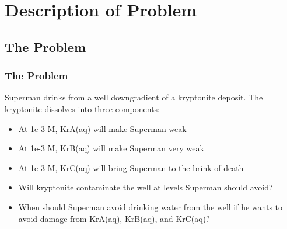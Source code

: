 \documentclass{beamer}
\newcommand\greencomment[1]{{{\color{green} #1}}}
\begin{document}

\section{Description of Problem}

\subsection{The Problem}

\begin{frame}[fragile]\frametitle{The Problem}
Superman drinks from a well downgradient of a kryptonite deposit. The kryptonite dissolves into three components:

\begin{itemize}
  \item At 1e-3 M, \greencomment{KrA(aq)} will make Superman weak
  \item At 1e-3 M, \greencomment{KrB(aq)} will make Superman very weak
  \item At 1e-3 M, \greencomment{KrC(aq)} will bring Superman to the brink of death
\end{itemize}

\begin{itemize}
  \item Will kryptonite contaminate the well at levels Superman should avoid? 
  \item When should Superman avoid drinking water from the well if he wants to avoid damage from \greencomment{KrA(aq)}, \greencomment{KrB(aq)}, and \greencomment{KrC(aq)}?
\end{itemize}

\end{frame}
\end{document}

